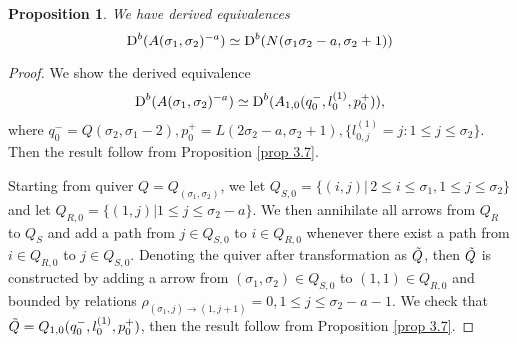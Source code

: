 \documentclass[a4paper, reqno]{amsart}
\newtheorem{prop}[thm]{Proposition}
\theoremstyle{definition}
\theoremstyle{remark}
\numberwithin{equation}{section}
\begin{document}
\begin{prop}
    We have derived equivalences 
    $$
    {\textup{D}^{b}( A(\sigma_1,\sigma_2)^{-a})} \simeq
    {\textup{D}^{b}( N(\sigma_1\sigma_2-a,\sigma_2+1))}
    $$
\end{prop}
\begin{proof}
    We show the derived equivalence 
    $${\textup{D}^{b}( A(\sigma_1,\sigma_2)^{-a})} \simeq
    \textup{D}^{b}(A_{1,0}(q^{-}_{0},l_{0}^{(1)},p^{+}_{0})),
    $$
    where $ q^{-}_{0} =  Q(\sigma_2, \sigma_1-2), p^{+}_{0} = L(2\sigma_2-a,\sigma_2+1), \{l_{0,j}^{(1)}=j:1\leq j\leq \sigma_2\}$. Then the result follow from Proposition \ref{prop 3.7}. 
    
    Starting from quiver $ Q = Q_(\sigma_1,\sigma_2) $, we let $ Q_{S,0} = \{(i,j)|\,2\leq i \leq \sigma_1, 1 \leq j \leq \sigma_2 \}$ and let $ Q_{R,0} = \{ (1,j)| 1\leq j\leq  \sigma_2-a \}$. We then annihilate all arrows from $Q_{R}$ to $Q_{S}$ and add a path from $j\in Q_{S,0}$ to $i\in Q_{R,0}$ whenever there exist a path from $i\in Q_{R,0}$ to $j\in Q_{S,0}$. Denoting the quiver after transformation as $\Tilde{Q}$, then $\Tilde{Q}$ is constructed by adding a arrow from 
 $(\sigma_1,\sigma_2)\in Q_{S,0} $ to $(1,1)\in Q_{R,0}$ and bounded by relations
 $\rho_{(\sigma_1,j)\to (1,j+1)} =0, 1\leq j \leq \sigma_2-a-1$. We check that $ \Tilde{Q}=Q_{1,0}(q^{-}_{0},l_{0}^{(1)},p^{+}_{0}) $, then the result follow from Proposition \ref{prop 3.7}. 
\end{proof}
\end{document}
